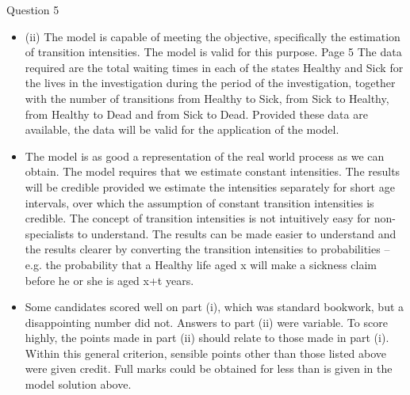 \documentclass[a4paper,12pt]{article}
\begin{document}
Question 5
\begin{itemize}
(i) Objectives of the modelling exercise.
Validity of the model for the purpose to which it is to be put.
Validity of the data to be used.
Possible errors associated with the model or parameters used not being a perfect
representation of the real world situation being modelled.
Impact of correlations between the random variables that “drive” the model.
Extent of correlations between the results produced from the model.
Current relevance of models written and used in the past.
Credibility of the data input.
Credibility of the results output.
Dangers of spurious accuracy.
Ease with which the model and its results can be communicated.
The time and cost of constructing and maintaining the model.
\item 
(ii) The model is capable of meeting the objective, specifically the estimation of transition
intensities.
The model is valid for this purpose.
Page 5%
The data required are the total waiting times in each of the states Healthy and Sick for
the lives in the investigation during the period of the investigation, together with the
number of transitions from Healthy to Sick, from Sick to Healthy, from Healthy to Dead and from Sick to Dead.
Provided these data are available, the data will be valid for the application of the
model.
\item The model is as good a representation of the real world process as we can obtain.
The model requires that we estimate constant intensities. The results will be credible provided we estimate the intensities separately for short age intervals, over which the
assumption of constant transition intensities is credible.
The concept of transition intensities is not intuitively easy for non-specialists to understand.
The results can be made easier to understand and the results clearer by converting the
transition intensities to probabilities – e.g. the probability that a Healthy life aged x will make a sickness claim before he or she is aged x+t years.
\item Some candidates scored well on part (i), which was standard bookwork, but a disappointing
number did not. Answers to part (ii) were variable. To score highly, the points made in part
(ii) should relate to those made in part (i). Within this general criterion, sensible points other
than those listed above were given credit. Full marks could be obtained for less than is given
in the model solution above.
\end{itemize}
\newpage 
\end{document}
